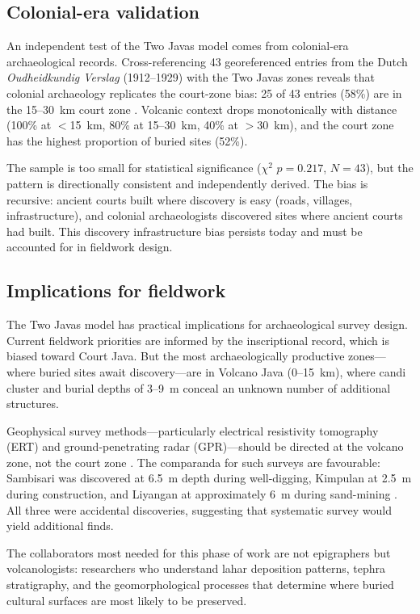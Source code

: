 \documentclass[12pt]{article}
\begin{document}
\subsection{Colonial-era validation}

An independent test of the Two Javas model comes from colonial-era archaeological records.
Cross-referencing 43 georeferenced entries from the Dutch \textit{Oudheidkundig Verslag} (1912--1929) with the Two Javas zones reveals that colonial archaeology replicates the court-zone bias: 25 of 43 entries (58\%) are in the 15--30~km court zone \citep{OV1912}.
Volcanic context drops monotonically with distance (100\% at $<$15~km, 80\% at 15--30~km, 40\% at $>$30~km), and the court zone has the highest proportion of buried sites (52\%).

The sample is too small for statistical significance ($\chi^2$ $p = 0.217$, $N = 43$), but the pattern is directionally consistent and independently derived.
The bias is recursive: ancient courts built where discovery is easy (roads, villages, infrastructure), and colonial archaeologists discovered sites where ancient courts had built.
This discovery infrastructure bias persists today and must be accounted for in fieldwork design.

\subsection{Implications for fieldwork}

The Two Javas model has practical implications for archaeological survey design.
Current fieldwork priorities are informed by the inscriptional record, which is biased toward Court Java.
But the most archaeologically productive zones---where buried sites await discovery---are in Volcano Java (0--15~km), where candi cluster and burial depths of 3--9~m conceal an unknown number of additional structures.

Geophysical survey methods---particularly electrical resistivity tomography (ERT) and ground-penetrating radar (GPR)---should be directed at the volcano zone, not the court zone \citep{Conyers2004}.
The comparanda for such surveys are favourable: Sambisari was discovered at 6.5~m depth during well-digging, Kimpulan at 2.5~m during construction, and Liyangan at approximately 6~m during sand-mining \citep{Putra2019, Abbas2016}.
All three were accidental discoveries, suggesting that systematic survey would yield additional finds.

The collaborators most needed for this phase of work are not epigraphers but volcanologists: researchers who understand lahar deposition patterns, tephra stratigraphy, and the geomorphological processes that determine where buried cultural surfaces are most likely to be preserved.
\end{document}
